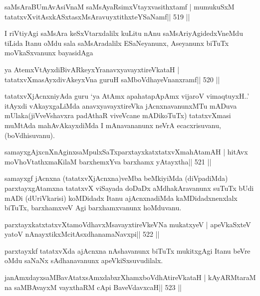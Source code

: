\begin{shl}
saMsAraBUmAvAsiVnaM saMsAyaRsimxVtayxvasithxtamf |
mumukuSxM tatatxvXvitAsxkASxtasxMsAravuyxtithxteYSaNamf\hfill || 519 ||
\end{shl}

\begin{artha}
I riVtiyAgi saMsAra keSxVtarxdalilx kuLitu nAnu saMsAriyAgidedxVneMdu
tiLida Itanu oMdu sala saMsAradalilx ESaNeyanunx, Aseyanunx biTuTx
moVkaSxvanunx bayasidAga 
\end{artha}

\begin{shl}
ya AtemxVtAyxdiBivARkeyxYranavxyavayxtireVkataH |
tatatxvXmasAyxdivAkeyxVna guruH saMboVdhayeVnanxramf\hfill || 520 ||
\end{shl}

\begin{artha}
tatatxvXjAcnxniyAda guru `ya AtAmx apahatapApAmx vijaroV vimaqtuyxH..' itAyxdi vAkayxgaLiMda anavxyavayxtireVka jAcnxnavanunxMTu mADuva mUlaka\break (jiVveVshavxra padAthaR viveVcane mADikoTuTx) tatatxvXmasi muMtAda mahAvAkayxdiMda I mAnavananunx neVrA ecacxrisuvanu, (boVdhisuvanu).
\end{artha}

\begin{shl}
samayxgAjxcnXnAginxsaMpulxSaTxparxtayxkatxtatxvXmahAtamAH |
hitAvx moVhoVtathxmaKilaM barxhemxYva barxhamx yAtayxtha\hfill || 521 ||
\end{shl}

\begin{artha}
samayxgf jAcnxna (tatatxvXjAcnxna)veMba beMkiyiMda (diVpadiMda)
parxtayxgAtamxna tatatxvX viSayada doDaDx aMdhakAravanunx suTuTx bUdi
mADi (dUriVkarisi) koMDidadx Itanu ajAcnxnadiMda kaMDidadxnenxlalx
biTuTx, barxhamxveV Agi barxhamxvanunx hoMduvanu.
\end{artha}

\begin{shl}
parxtayxkatxtatxvXtamoVdhavxMsavayxtireVkeVNa mukatxyeV |
apeVkaSxteV yatoV nAnayxtikxMcitAsxdhanamaNavxpi\hfill || 522 ||
\end{shl}

\begin{artha}
parxtayxkf tatatxvXda ajAcnxna nAshavanunx biTuTx mukitxgAgi Itanu beVre
oMdu saNaNx sAdhanavanunx apeVkiSxsuvudilalx.
\end{artha}

\begin{shl}
janAmxdayxsaMBavAtatxsAmxdabxrXhamxboVdhAtireVkataH |
kAyARMtaraM na saMBAvayxM vayxthaRM cApi BaveVdavxcaH\hfill || 523 ||
\end{shl}


